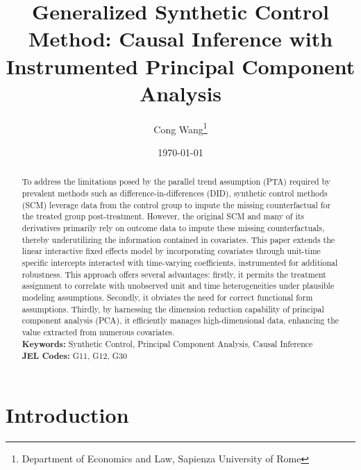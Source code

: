 \documentclass[12pt]{article}
\begin{document}
\begin{titlepage}
\title{Generalized Synthetic Control Method: Causal Inference with Instrumented Principal Component Analysis}
\author{ Cong Wang\thanks{Department of Economics and Law, Sapienza University of Rome}}
\date{\today}
\maketitle
\begin{abstract}
\noindent To address the limitations posed by the parallel trend assumption (PTA) required by prevalent methods such as difference-in-differences (DID), synthetic control methods (SCM) leverage data from the control group to impute the missing counterfactual for the treated group post-treatment. However, the original SCM and many of its derivatives primarily rely on outcome data to impute these missing counterfactuals, thereby underutilizing the information contained in covariates. This paper extends the linear interactive fixed effects model by incorporating covariates through unit-time specific intercepts interacted with time-varying coefficients, instrumented for additional robustness. This approach offers several advantages: firstly, it permits the treatment assignment to correlate with unobserved unit and time heterogeneities under plausible modeling assumptions. Secondly, it obviates the need for correct functional form assumptions. Thirdly, by harnessing the dimension reduction capability of principal component analysis (PCA), it efficiently manages high-dimensional data, enhancing the value extracted from numerous covariates. \\

\noindent\textbf{Keywords:} Synthetic Control, Principal Component Analysis, Causal Inference\\

\noindent\textbf{JEL Codes:} G11, G12, G30\\
\bigskip
\end{abstract}
\setcounter{page}{0}
\thispagestyle{empty}
\end{titlepage}
\pagebreak \newpage

\doublespacing

\section{Introduction} 
\label{sec:introduction}
\end{document}
